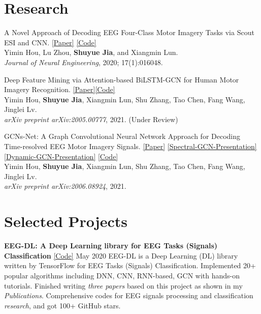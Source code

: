 \documentclass{my_cv}
\begin{document}
\hspace*{\fill} 

\section{Research}
\workitemsone
{A Novel Approach of Decoding EEG Four-Class Motor Imagery Tasks via Scout ESI and CNN. \href{https://iopscience.iop.org/article/10.1088/1741-2552/ab4af6/meta}{[Paper]} \href{https://github.com/SuperBruceJia/EEG-Motor-Imagery-Classification-CNNs-TensorFlow}{[Code]}\\
	Yimin Hou, Lu Zhou, \textbf{Shuyue Jia}, and Xiangmin Lun. \\
	\emph{Journal of Neural Engineering}, 2020; 17(1):016048.}

\hspace*{\fill} 

\workitemsone
{Deep Feature Mining via Attention-based BiLSTM-GCN for Human Motor Imagery Recognition. \href{https://arxiv.org/abs/2005.00777}{[Paper]}\href{https://github.com/SuperBruceJia/EEG-DL}{[Code]}\\
	Yimin Hou, \textbf{Shuyue Jia}, Xiangmin Lun, Shu Zhang, Tao Chen, Fang Wang, Jinglei Lv. \\
	\emph{arXiv preprint arXiv:2005.00777}, 2021. (Under Review)}
	
\hspace*{\fill}

\workitemsone
{GCNs-Net: A Graph Convolutional Neural Network Approach for Decoding Time-resolved EEG Motor Imagery Signals. \href{https://arxiv.org/abs/2006.08924}{[Paper]} \href{https://shuyuej.com/files/GCNs-Net.pdf}{[Spectral-GCN-Presentation]} \href{https://shuyuej.com/files/Dynamic-GCN-Survey.pdf}{[Dynamic-GCN-Presentation]} \href{https://github.com/SuperBruceJia/EEG-DL}{[Code]}\\
	Yimin Hou, \textbf{Shuyue Jia}, Xiangmin Lun, Shu Zhang, Tao Chen, Fang Wang, Jinglei Lv. \\
	\emph{arXiv preprint arXiv:2006.08924}, 2021.}

\hspace*{\fill} 

\section{Selected Projects}
\noindent \textbf{EEG-DL: A Deep Learning library for EEG Tasks (Signals) Classification} \href{https://github.com/SuperBruceJia/EEG-DL}{[Code]} \hfill May 2020 
\workitemsfour
{EEG-DL is a Deep Learning (DL) library written by TensorFlow for EEG Tasks (Signals) Classification.}
{Implemented 20+ popular algorithms including DNN, CNN, RNN-based, GCN with hands-on tutorials.}
{Finished writing \emph{three papers} based on this project as shown in my \emph{Publications}.}
{Comprehensive codes for EEG signals processing and classification \emph{research}, and got 100+ GitHub stars.}
\end{document}

